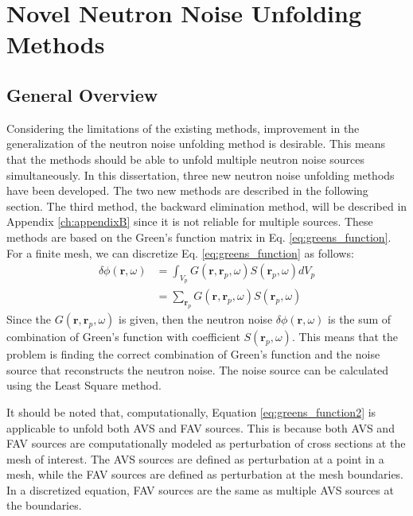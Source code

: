 \section{Novel Neutron Noise Unfolding Methods}

\subsection{General Overview}

Considering the limitations of the existing methods, improvement in the generalization of the neutron noise unfolding method is desirable. This means that the methods should be able to unfold multiple neutron noise sources simultaneously. In this dissertation, three new neutron noise unfolding methods have been developed. The two new methods are described in the following section. The third method, the backward elimination method, will be described in Appendix \ref{ch:appendixB} since it is not reliable for multiple sources. These methods are based on the Green’s function matrix in Eq. \ref{eq:greens_function}. For a finite mesh, we can discretize Eq. \ref{eq:greens_function} as follows:
\begin{equation}\label{eq:greens_function2}
    \begin{aligned}
        \delta \phi(\textbf{r}, \omega) &= \int_{V_p} G(\textbf{r}, \textbf{r}_p,\omega) S(\textbf{r}_p,\omega) dV_p \\
        &= \sum_{\textbf{r}_p} G(\textbf{r}, \textbf{r}_p,\omega) S(\textbf{r}_p,\omega)
    \end{aligned}
\end{equation}
Since the $G(\textbf{r}, \textbf{r}_p,\omega)$ is given, then the neutron noise $\delta \phi(\textbf{r}, \omega)$ is the sum of combination of Green's function with coefficient $S(\textbf{r}_p,\omega)$. This means that the problem is finding the correct combination of Green’s function and the noise source that reconstructs the neutron noise. The noise source can be calculated using the Least Square method.

It should be noted that, computationally, Equation  \ref{eq:greens_function2} is applicable to unfold both AVS and FAV sources. This is because both AVS and FAV sources are computationally modeled as perturbation of cross sections at the mesh of interest. The AVS sources are defined as perturbation at a point in a mesh, while the FAV sources are defined as perturbation at the mesh boundaries. In a discretized equation, FAV sources are the same as multiple AVS sources at the boundaries.

